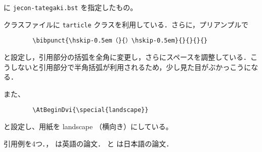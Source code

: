 \documentclass[10pt]{tarticle}
\begin{document}
\verb|| に \verb|jecon-tategaki.bst| を指定したもの。
\vspace*{1em}

クラスファイルに \texttt{tarticle} クラスを利用している．さらに，プリアンプルで
\begin{verbatim}
        \bibpunct{\hskip-0.5em（}{）\hskip-0.5em}{}{}{}{}
\end{verbatim}
と設定し，引用部分の括弧を全角に変更し，さらにスペースを調整している．こ
うしないと引用部分で半角括弧が利用されるため，少し見た目がぶかっこうにな
る．

また、
\begin{verbatim}
        \AtBeginDvi{\special{landscape}}
\end{verbatim}
と設定し、用紙を landscape （横向き）にしている。
\vspace*{2em}

引用例を4つ．\citet{ishikawa03:_green_gas_emiss_contr_open_econom}，
\citet{takeda06:_cge_analy_welfar_effec_trade} は英語の論文．
\citet{oyama99:_mark_stru} と \citet{kuroda97jp:keo} は日本語の論文．

\nocite{*}



%

\end{document}
